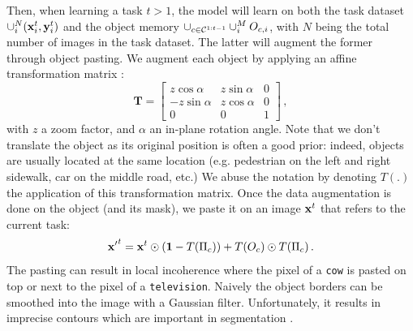 Then, when learning a task $t > 1$, the model will learn on both the task dataset $\cup_i^N
    (\mathbf{x}^t_i, \mathbf{y}^t_i)$ and the object memory $\cup_{c \in \mathcal{C}^{1:t-1}} \cup_i^M O_{c,i}$, with $N$
being the total number of images in the task dataset. The latter will augment the former through
object pasting. We augment each object by applying an affine transformation matrix
\citep{fang2019instaboost}:
%
\begin{equation}
    \mathbf{T}=\left[\begin{array}{ccc}
            z \cos \alpha  & z \sin \alpha & 0 \\
            -z \sin \alpha & z \cos \alpha & 0 \\
            0              & 0             & 1
        \end{array}\right]\,,
    \label{eq:seg_transformation_matrix_complex}
\end{equation}
%
\noindent with $z$ a zoom factor, and $\alpha$ an in-plane rotation angle. Note that we don't
translate the object as its original position is often a good prior: indeed, objects are usually
located at the same location (e.g. pedestrian on the left and right sidewalk, car on the middle
road, etc.) We abuse the notation by denoting $T(.)$ the application of this transformation matrix.
Once the data augmentation is done on the object (and its mask), we paste it on an image $\mathbf{x}^t$ that
refers to the current task:
%
\begin{equation}
    {\mathbf{x}'}^t = \mathbf{x}^t \odot (\mathbf{1} - T(\Pi_c)) + T(O_c) \odot T(\Pi_c)\,.
    \label{eq:seg_pasting}
\end{equation}
%
The pasting can result in local incoherence where the pixel of a \texttt{cow} is pasted on top or
next to the pixel of a \texttt{television}. Naively the object borders can be smoothed into the
image with a Gaussian filter. Unfortunately, it results in imprecise contours which are important in
segmentation \citep{chen2020semeda}.

